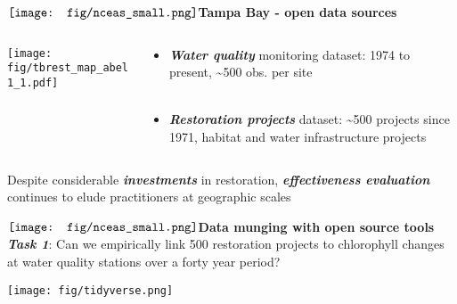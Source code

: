 \documentclass[serif]{beamer}\usepackage[]{graphicx}\usepackage[]{color}
\newcommand{\emtxt}[1]{\textbf{\textit{{\color{mypal4} #1}}}}
\begin{document}
\begin{frame}{{$\vcenter{\hbox{\texttt{[image: fig/nceas\_small.png]}}}$\hspace{0.07in}\textbf{Tampa Bay - open data sources}}}
\begin{columns}
\begin{column}{0.5\textwidth}
\onslide<+->
\begin{center}
\texttt{[image: fig/tbrest\_map\_abel1\_1.pdf]}
\end{center}
\end{column}
\begin{column}{0.5\textwidth}
\begin{itemize}
\item \emtxt{Water quality} monitoring dataset: 1974 to present, \textasciitilde 500 obs. per site \\~\\
\item<+-> \emtxt{Restoration projects} dataset: \textasciitilde 500 projects since 1971, habitat and water infrastructure projects
\end{itemize}
\end{column}
\end{columns}
\onslide<+->
\begin{center}
Despite considerable \emtxt{investments} in restoration, \emtxt{effectiveness evaluation} continues to elude practitioners at geographic scales {\footnotesize \cite{Diefenderfer16}}
\end{center}
\end{frame}

\begin{frame}[t]{{$\vcenter{\hbox{\texttt{[image: fig/nceas\_small.png]}}}$\hspace{0.07in}\textbf{Data munging with open source tools}}}
\emtxt{Task 1}: Can we empirically link 500 restoration projects to chlorophyll changes at water quality stations over a forty year period? 
\vfill
\centerline{\texttt{[image: fig/tidyverse.png]}}
\end{frame}
\end{document}
